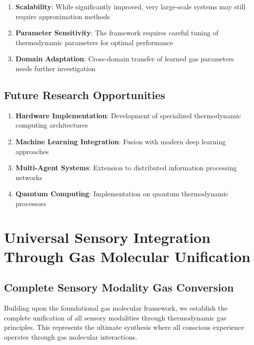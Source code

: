 \documentclass[11pt,a4paper]{article}
\begin{document}
\begin{enumerate}
\item \textbf{Scalability}: While significantly improved, very large-scale systems may still require approximation methods
\item \textbf{Parameter Sensitivity}: The framework requires careful tuning of thermodynamic parameters for optimal performance
\item \textbf{Domain Adaptation}: Cross-domain transfer of learned gas parameters needs further investigation
\end{enumerate}

\subsection{Future Research Opportunities}

\begin{enumerate}
\item \textbf{Hardware Implementation}: Development of specialized thermodynamic computing architectures
\item \textbf{Machine Learning Integration}: Fusion with modern deep learning approaches
\item \textbf{Multi-Agent Systems}: Extension to distributed information processing networks
\item \textbf{Quantum Computing}: Implementation on quantum thermodynamic processors
\end{enumerate}

\section{Universal Sensory Integration Through Gas Molecular Unification}

\subsection{Complete Sensory Modality Gas Conversion}

Building upon the foundational gas molecular framework, we establish the complete unification of all sensory modalities through thermodynamic gas principles. This represents the ultimate synthesis where all conscious experience operates through gas molecular interactions.
\end{document}
